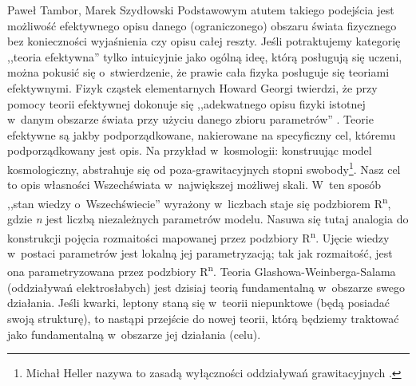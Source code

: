 \begin{artplenv}{Paweł Tambor, Marek Szydłowski}
Podstawowym atutem takiego podejścia jest możliwość efektywnego opisu danego (ograniczonego) obszaru świata fizycznego bez konieczności wyjaśnienia czy opisu całej reszty. Jeśli potraktujemy kategorię ,,teoria efektywna'' tylko intuicyjnie jako ogólną ideę, którą posługują się uczeni, można pokusić się o~stwierdzenie, że prawie cała fizyka posługuje się teoriami efektywnymi. Fizyk cząstek elementarnych Howard Georgi twierdzi, że przy pomocy teorii efektywnej dokonuje się ,,adekwatnego opisu fizyki istotnej w~danym obszarze świata przy użyciu danego zbioru parametrów''
\parencite[][]{georgi_effective_1993}. %
 Teorie efektywne są jakby podporządkowane, nakierowane na specyficzny cel, któremu podporządkowany jest opis. Na przykład w~kosmologii: konstruując model kosmologiczny, abstrahuje się od poza-grawitacyjnych stopni swobody\footnote{Michał Heller nazywa to zasadą wyłączności oddziaływań grawitacyjnych 
\parencite[][s.~60]{heller_ewolucyjny_1969}.%
}. Nasz cel to opis własności Wszechświata w~największej możliwej skali. W~ten sposób ,,stan wiedzy o~Wszechświecie'' wyrażony w~liczbach staje się podzbiorem R\textsuperscript{n}, gdzie \textit{n} jest liczbą niezależnych parametrów modelu. Nasuwa się tutaj analogia do konstrukcji pojęcia rozmaitości mapowanej przez podzbiory R\textsuperscript{n}. Ujęcie wiedzy w~postaci parametrów jest lokalną jej parametryzacją; tak jak rozmaitość, jest ona parametryzowana przez podzbiory R\textsuperscript{n}. Teoria Glashowa-Weinberga-Salama (oddziaływań elektrosłabych) jest dzisiaj teorią fundamentalną w~obszarze swego działania. Jeśli kwarki, leptony staną się w~teorii niepunktowe (będą posiadać swoją strukturę), to nastąpi przejście do nowej teorii, którą będziemy traktować jako fundamentalną w~obszarze jej działania (celu).


\end{artplenv}
